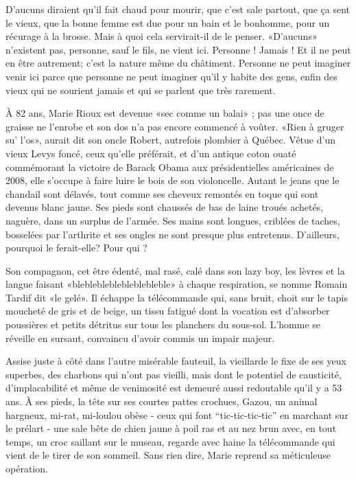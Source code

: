  {D'aucuns diraient}{ qu’il fait chaud pour mourir, que c’est sale partout, que ça sent le vieux, que la bonne femme est due pour un bain et le bonhomme, pour un récurage à la brosse. Mais à quoi cela servirait-il de le penser. «D’aucuns» n’existent pas, personne, sauf le fils, ne vient ici. Personne ! Jamais ! Et il ne peut en être autrement; c’est la nature même du châtiment. Personne ne peut imaginer venir ici parce que personne ne peut imaginer qu’il y habite des gens, enfin des vieux qui ne sourient jamais et qui se parlent que très rarement.}

À 82 ans, Marie Rioux est devenue «sec comme un balai» ; pas une once de graisse ne l’enrobe et son dos n’a pas encore commencé à voûter. «Rien à gruger su’ l’os», aurait dit son oncle Robert, autrefois plombier à Québec. Vêtue d’un vieux Levys foncé, ceux qu’elle préférait, et d’un antique coton ouaté commémorant la victoire de Barack Obama aux présidentielles américaines de 2008, elle s’occupe à faire luire le bois de son violoncelle. Autant le jeans que le chandail sont délavés, tout comme ses cheveux remontés en toque qui sont devenus blanc jaune. Ses pieds sont chaussés de bas de laine troués achetés, naguère, dans un surplus de l’armée. Ses mains sont longues, criblées de taches, bosselées par l’arthrite et ses ongles ne sont presque plus entretenus. D’ailleurs, pourquoi le ferait-elle? Pour qui ?

Son compagnon, cet être édenté, mal rasé, calé dans son lazy boy, les lèvres et la langue faisant «bleblebleblebleblebleble» à chaque respiration, se nomme Romain Tardif dit «le gelé». Il échappe la télécommande qui, sans bruit, choit sur le tapis moucheté de gris et de beige, un tissu fatigué dont la vocation est d’absorber poussières et petits détritus sur tous les planchers du sous-sol. L’homme se réveille en sursaut, convaincu d’avoir commis un impair majeur.

Assise juste à côté dans l’autre misérable fauteuil, la vieillarde le fixe de ses yeux superbes, des charbons qui n’ont pas vieilli, mais dont le potentiel de causticité, d’implacabilité et même de venimosité est demeuré aussi redoutable qu’il y a 53 ans. À ses pieds, la tête sur ses courtes pattes crochues, Gazou, un animal hargneux, mi-rat, mi-loulou obèse - ceux qui font “tic-tic-tic-tic” en marchant sur le prélart - une sale bête de chien jaune à poil ras et au nez brun avec, en tout temps, un croc saillant sur le museau, regarde avec haine la télécommande qui vient de le tirer de son sommeil. Sans rien dire, Marie reprend sa méticuleuse opération.

